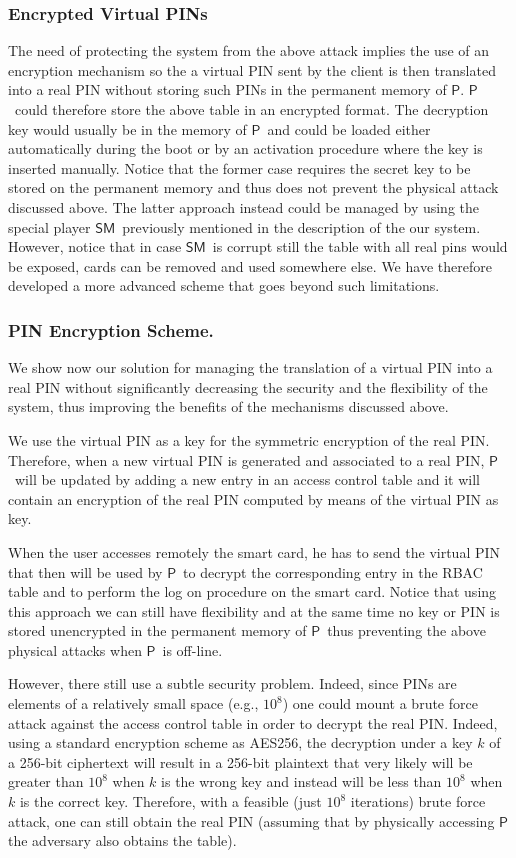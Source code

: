 \documentclass{sig-alternate}
\newcommand{\SM}{\ensuremath{\mathsf{SM}}}
\newcommand{\Proxy}{\ensuremath{\mathsf{P}}}
\begin{document}
\subsubsection{Encrypted Virtual PINs}
The need of protecting the system from the above attack implies the use of an encryption mechanism so the a virtual PIN sent by the client is then translated into a real
PIN without storing such PINs in the permanent memory of \Proxy. \Proxy\ could therefore store the above table in an encrypted format. The decryption key would
usually be in the memory of \Proxy\ and could be loaded either automatically during the boot or by an activation procedure where the key is inserted manually. Notice that the former case requires the secret key to be stored on the permanent memory and thus does not prevent the physical attack discussed above. The latter approach instead could be managed by using the special player \SM\ previously mentioned in the description of the our system. However, notice that in case \SM\ is
corrupt still the table with all real pins would be exposed, cards can be removed and used somewhere else. We have therefore developed a more
advanced scheme that goes beyond such limitations.

\subsubsection{PIN Encryption Scheme.}
We show now our solution for managing the translation of a virtual PIN into a real PIN without significantly
decreasing the security and the flexibility of the system, thus improving the
benefits of the mechanisms discussed above.

We use the virtual PIN as a key for the symmetric encryption of the real PIN. Therefore, when a new virtual PIN is generated and associated to a real PIN, \Proxy\ will be updated by adding a new entry in an access control table and it will contain an encryption of the real PIN computed by means of the virtual PIN as key.

When the user accesses remotely the smart card, he has to send the virtual PIN that then will be used by \Proxy\ to decrypt the corresponding entry in the RBAC table and to perform the log on procedure on the smart card. Notice that using this approach we can still have flexibility and at the same time no key or PIN is stored unencrypted in the permanent memory of \Proxy\ thus preventing the above physical attacks when \Proxy\ is off-line.

However, there still use a subtle security problem. Indeed, since PINs are elements of a relatively small space (e.g., $10^8$) one could mount a brute force attack against the access control table in order to decrypt the real PIN. Indeed, using a standard encryption scheme as AES256, the decryption under a key $k$
of a 256-bit ciphertext will result in a 256-bit  plaintext that very likely will be greater than $10^8$ when $k$ is the wrong key and instead will be less than $10^8$ when $k$
is the correct key. Therefore, with a feasible (just $10^8$ iterations) brute force attack, one can still obtain the real PIN (assuming that by physically
accessing \Proxy the adversary also obtains the table).
\end{document}
